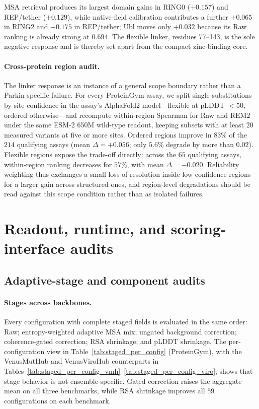 \documentclass{article} %
\begin{document}
MSA retrieval produces its largest domain gains in RING0 ($+0.157$) and REP/tether ($+0.129$), while native-field calibration contributes a further $+0.065$ in RING2 and $+0.175$ in REP/tether; Ubl moves only $+0.032$ because its Raw ranking is already strong at $0.694$. The flexible linker, residues 77--143, is the sole negative response and is thereby set apart from the compact zinc-binding core.

\paragraph{Cross-protein region audit.}
The linker response is an instance of a general scope boundary rather than a Parkin-specific failure. For every ProteinGym assay, we split single substitutions by site confidence in the assay's AlphaFold2 model---flexible at pLDDT $<50$, ordered otherwise---and recompute within-region Spearman for Raw and \textsc{REM2} under the same \textsc{ESM-2} 650M wild-type readout, keeping subsets with at least $20$ measured variants at five or more sites. Ordered regions improve in $83\%$ of the $214$ qualifying assays (mean $\Delta=+0.056$; only $5.6\%$ degrade by more than $0.02$). Flexible regions expose the trade-off directly: across the $65$ qualifying assays, within-region ranking decreases for $57\%$, with mean $\Delta=-0.020$. Reliability weighting thus exchanges a small loss of resolution inside low-confidence regions for a larger gain across structured ones, and region-level degradations should be read against this scope condition rather than as isolated failures.

\FloatBarrier
\section{Readout, runtime, and scoring-interface audits}
\label{app:readout_runtime}

\subsection{Adaptive-stage and component audits}

\paragraph{Stages across backbones.}
Every configuration with complete staged fields is evaluated in the same order: Raw; entropy-weighted adaptive MSA mix; ungated background correction; coherence-gated correction; RSA shrinkage; and pLDDT shrinkage. The per-configuration view in Table~\ref{tab:staged_per_config} (ProteinGym), with the VenusMutHub and VenusViroHub counterparts in Tables~\ref{tab:staged_per_config_vmh}--\ref{tab:staged_per_config_viro}, shows that stage behavior is not ensemble-specific. Gated correction raises the aggregate mean on all three benchmarks, while RSA shrinkage improves all $59$ configurations on each benchmark.
\end{document}
